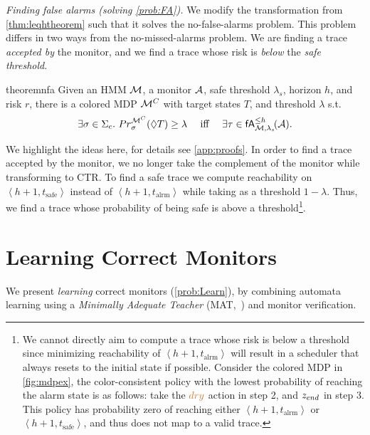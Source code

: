 \documentclass[runningheads]{llncs}
\newcommand{\appcite}[2]{#2} %
\newcommand{\sj}[2][]{\todo[color=red!50!white,#1]{\footnotesize{SJ: #2}}}
\newcommand{\talrm}{t_{\text{alrm}}}
\newcommand{\tsafe}{t_{\text{safe}}}
\newcommand{\dry}{{\color{brown} dry}\xspace}
\newcommand{\en}{z_{\color{black} end}\xspace}
\newcommand{\alarms}[1][h+1]{\left\langle #1, \talrm\right\rangle}
\newcommand{\safes}[1][h+1]{\left\langle #1, \tsafe\right\rangle}
\newcommand{\falsealarms}[2]{\mathsf{fA}_{#1}^{#2}}
\newcommand{\ccSched}{\Sigma_c}
\renewcommand{\paragraph}[1]{\smallskip\noindent\emph{#1}}
\begin{document}
\paragraph{Finding false alarms (solving \cref{prob:FA}).}
We modify the transformation from \cref{thm:leqhtheorem} such that it solves the no-false-alarms problem.
This problem differs in two ways from the no-missed-alarms problem. We are finding a trace \emph{accepted by} the monitor, and we find a trace whose risk is \emph{below} the \emph{safe threshold}.
\begin{restatable}{theorem}{nfa}
    \label{thm:nfa}
    Given an HMM $\mathcal{M}$, a monitor $\mathcal{A}$, safe threshold $\lambda_s$, horizon $h$, and risk $r$, there is a colored MDP $\mathcal{M}^{C}$ with target states $T$, and threshold $\lambda$ s.t.\
    \[ \exists \sigma \in \ccSched.\ \Prob^{\mdpc}_{\sigma}(\lozenge T) \geq \lambda\quad\text{ iff }\quad \exists \tau\in \falsealarms{\mc,\lambda_s}{\leq h}\!(\dfa).\]
\end{restatable}
\noindent We highlight the ideas here, for details see \appcite{\cite[App. A]{TR}}{\cref{app:proofs}}.
In order to find a trace accepted by the monitor, we no longer take the complement of the monitor while transforming to CTR. To find a safe trace we compute reachability on $\safes$ instead of $\alarms$ while taking as a threshold $1-\lambda$. Thus, we find a trace whose probability of being safe is above a threshold\footnote{We cannot directly aim to compute a trace whose risk is below a threshold since minimizing reachability of $\alarms$ will result in a scheduler that always resets to the initial state if possible. Consider the colored MDP in \cref{fig:mdpex}, the color-consistent policy with the lowest probability of reaching the alarm state is as follows: take the $\dry$ action in step 2, and $\en$ in step 3. This policy has probability zero of reaching either $\alarms$ or $\safes$, and thus does not map to a valid trace.}.

\section{Learning Correct Monitors}\label{sec:learning}
We present \emph{learning} correct monitors (\cref{prob:Learn}), by combining automata learning using a \emph{Minimally Adequate Teacher} (MAT,~\cite{DBLP:journals/iandc/Angluin87}) and monitor verification.
\end{document}
